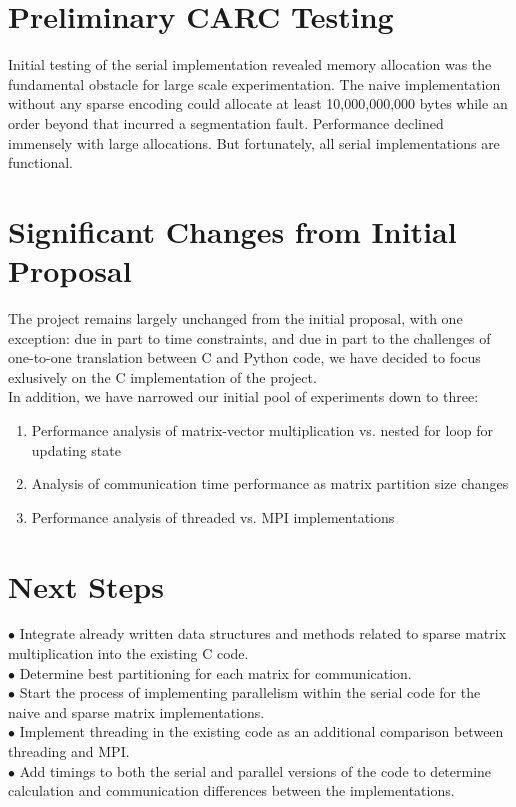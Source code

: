 \documentclass[12pt]{article}
\begin{document}
\section{Preliminary CARC Testing}

\noindent Initial testing of the serial implementation revealed memory allocation was the fundamental
obstacle for large scale experimentation. The naive implementation without any sparse encoding could 
allocate at least 10,000,000,000 bytes while an order beyond that incurred a segmentation fault. 
Performance declined immensely with large allocations. But fortunately, all serial implementations are
functional. \par

\section{Significant Changes from Initial Proposal}

The project remains largely unchanged from the initial proposal, with one exception: due in part to time constraints, and due in part to the challenges of one-to-one translation between C and Python code, we have decided to focus exlusively on the C implementation of the project. \\

In addition, we have narrowed our initial pool of experiments down to three:

\begin{enumerate}
    \item Performance analysis of matrix-vector multiplication vs. nested for loop for updating state
    \item Analysis of communication time performance as matrix partition size changes
    \item Performance analysis of threaded vs. MPI implementations
\end{enumerate}

\section{Next Steps}
$\bullet$ Integrate already written data structures and methods 
related to sparse matrix multiplication into the existing C code. \\
$\bullet$ Determine best partitioning for each matrix for communication. \\
$\bullet$ Start the process of implementing parallelism within the serial code for the
naive and sparse matrix implementations. \\
$\bullet$ Implement threading in the existing code as an additional comparison between threading and MPI. \\
$\bullet$ Add timings to both the serial and parallel versions of the code to determine 
calculation and communication differences between the implementations. \\
\end{document}
